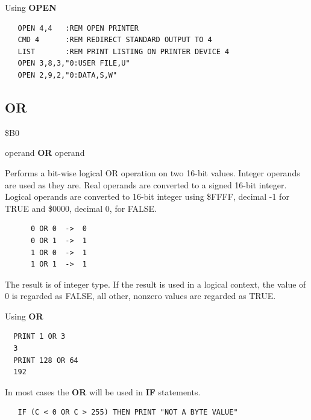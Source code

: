 \begin{description}[leftmargin=2cm,style=nextline]
\item [Example:] Using {\bf OPEN}

\begin{tcolorbox}[colback=black,coltext=white]
\verbatimfont{\codefont}
\begin{verbatim}
   OPEN 4,4   :REM OPEN PRINTER
   CMD 4      :REM REDIRECT STANDARD OUTPUT TO 4
   LIST       :REM PRINT LISTING ON PRINTER DEVICE 4
   OPEN 3,8,3,"0:USER FILE,U"
   OPEN 2,9,2,"0:DATA,S,W"
\end{verbatim}
\end{tcolorbox}
\end{description}


\newpage
\subsection{OR}
\begin{description}[leftmargin=2cm,style=nextline]
\item [Token:] \$B0
\item [Format:] operand {\bf OR} operand
\item [Usage:]  Performs a bit-wise
                logical OR operation on two 16-bit values.
                Integer operands are used as they are.
                Real operands are converted to a signed 16-bit integer.
                Logical operands are converted to 16-bit integer
                using \$FFFF, decimal -1 for TRUE
                and \$0000, decimal 0, for FALSE.

   \begin{verbatim}
      0 OR 0  ->  0
      0 OR 1  ->  1
      1 OR 0  ->  1
      1 OR 1  ->  1
   \end{verbatim}

\item [Remarks:] The result is of integer type.
                 If the result is used in a logical context,
                 the value of 0 is regarded as FALSE,
                 all other, nonzero values are regarded as TRUE.
\item [Example:] Using {\bf OR}

\begin{tcolorbox}[colback=black,coltext=white]
\verbatimfont{\codefont}
\begin{verbatim}
  PRINT 1 OR 3
  3
  PRINT 128 OR 64
  192
\end{verbatim}
\end{tcolorbox}

In most cases the {\bf OR} will be used in {\bf IF} statements.

\begin{tcolorbox}[colback=black,coltext=white]
\verbatimfont{\codefont}
\begin{verbatim}
   IF (C < 0 OR C > 255) THEN PRINT "NOT A BYTE VALUE"
\end{verbatim}
\end{tcolorbox}
\end{description}

